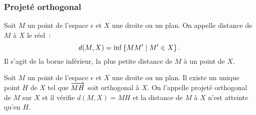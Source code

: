 \subsubsection{Projeté orthogonal}
\begin{defdef}
  Soit $M$ un point de l'espace $\epsilon$ et $X$ une droite ou un plan. On appelle distance de $M$ à $X$ le réel~:
  \begin{equation}
    d(M,X)=\operatorname{inf}\left\{MM'\mathrel{}\middle|\mathrel{}M' \in X\right\}.
  \end{equation}
Il s'agit de la borne inférieur, la plus petite distance de $M$ à un point de $X$.
\end{defdef}
%
\begin{prop}
  Soit $M$ un point de l'espace $\epsilon$ et $X$ une droite ou un plan. Il existe un unique point $H$ de $X$ tel que $\overrightarrow{MH}$ soit orthogonal à $X$. On l'appelle projeté orthogonal de $M$ sur $X$ et il vérifie $d(M,X)=MH$ et la distance de $M$ à $X$ n'est atteinte qu'en $H$.
\end{prop}
